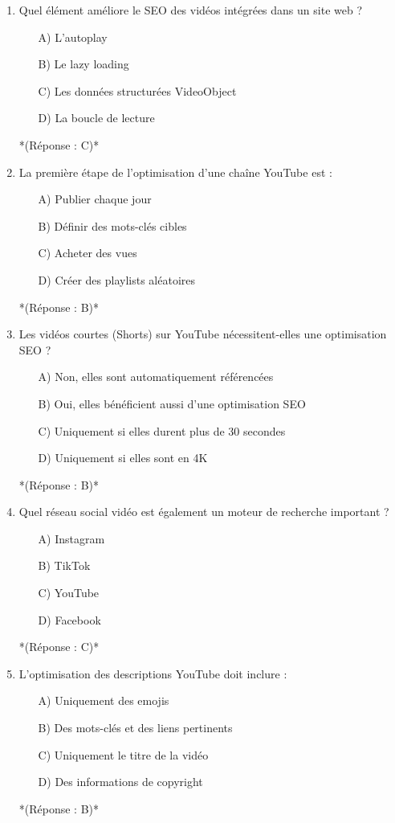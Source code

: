 \documentclass[12pt,a4paper,twoside]{report}
\begin{document}
\begin{enumerate}
    \item Quel élément améliore le SEO des vidéos intégrées dans un site web ?
    \begin{itemize}
        \item[A)] L'autoplay
        \item[B)] Le lazy loading
        \item[C)] Les données structurées VideoObject
        \item[D)] La boucle de lecture
    \end{itemize}
    *(Réponse : C)*

    \item La première étape de l'optimisation d'une chaîne YouTube est :
    \begin{itemize}
        \item[A)] Publier chaque jour
        \item[B)] Définir des mots-clés cibles
        \item[C)] Acheter des vues
        \item[D)] Créer des playlists aléatoires
    \end{itemize}
    *(Réponse : B)*

    \item Les vidéos courtes (Shorts) sur YouTube nécessitent-elles une optimisation SEO ?
    \begin{itemize}
        \item[A)] Non, elles sont automatiquement référencées
        \item[B)] Oui, elles bénéficient aussi d'une optimisation SEO
        \item[C)] Uniquement si elles durent plus de 30 secondes
        \item[D)] Uniquement si elles sont en 4K
    \end{itemize}
    *(Réponse : B)*

    \item Quel réseau social vidéo est également un moteur de recherche important ?
    \begin{itemize}
        \item[A)] Instagram
        \item[B)] TikTok
        \item[C)] YouTube
        \item[D)] Facebook
    \end{itemize}
    *(Réponse : C)*

    \item L'optimisation des descriptions YouTube doit inclure :
    \begin{itemize}
        \item[A)] Uniquement des emojis
        \item[B)] Des mots-clés et des liens pertinents
        \item[C)] Uniquement le titre de la vidéo
        \item[D)] Des informations de copyright
    \end{itemize}
    *(Réponse : B)*


\end{enumerate}
\end{document}
